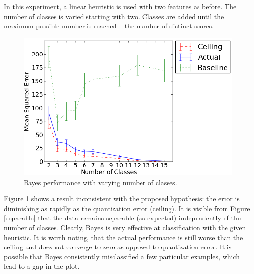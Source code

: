 \documentclass[12pt,notitlepage,twoside]{scrbook}
\begin{document}
In this experiment, a linear heuristic is used with two features as before. The number of
classes is varied starting with two. Classes are added until the maximum possible
number is reached -- the number of distinct scores. 

\begin{figure}[h!]
	\centering
  \includegraphics[width=0.8\linewidth]{figs/quants.png}
  \caption{Bayes performance with varying number of classes.\label{quants}}
\end{figure}
Figure \ref{quants} shows a result inconsistent with the proposed hypothesis: the error is
diminishing as rapidly as the quantization error (ceiling). It is visible from Figure
\ref{separable} that the data remains separable (as expected) independently of the number
of classes. Clearly, Bayes is very effective at classification with the given heuristic.
It is worth noting, that the actual performance is still worse than the ceiling and does
not converge to zero as opposed to quantization error. It is possible that Bayes
consistently misclassified a few particular examples, which lead to a gap in the plot.
\end{document}

